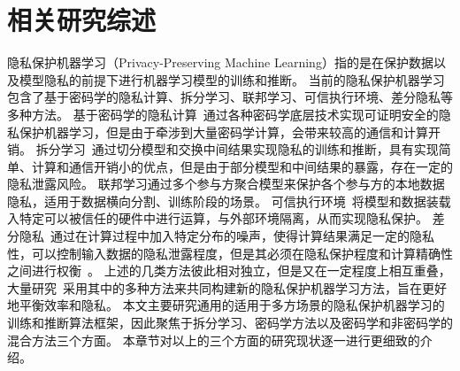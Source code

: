 \chapter{相关研究综述}
隐私保护机器学习（Privacy-Preserving Machine Learning）指的是在保护数据以及模型隐私的前提下进行机器学习模型的训练和推断。
%
当前的隐私保护机器学习包含了基于密码学的隐私计算、拆分学习、联邦学习、可信执行环境、差分隐私等多种方法。
%
基于密码学的隐私计算~\cite{al_2019_ppml}通过各种密码学底层技术实现可证明安全的隐私保护机器学习，但是由于牵涉到大量密码学计算，会带来较高的通信和计算开销。
%
拆分学习~\cite{vepakomma2018split}通过切分模型和交换中间结果实现隐私的训练和推断，具有实现简单、计算和通信开销小的优点，但是由于部分模型和中间结果的暴露，存在一定的隐私泄露风险。
%
联邦学习\cite{yangqiang2019federated,mcmahan_2017_fedavg}通过多个参与方聚合模型来保护各个参与方的本地数据隐私，适用于数据横向分割、训练阶段的场景。
%
可信执行环境~\cite{sabt_2015_tee,2016_intel_sgx}将模型和数据装载入特定可以被信任的硬件中进行运算，与外部环境隔离，从而实现隐私保护。
%
差分隐私~\cite{dwork_2006_differential_privacy,wuruihan_2023_label_dp}通过在计算过程中加入特定分布的噪声，使得计算结果满足一定的隐私性，可以控制输入数据的隐私泄露程度，但是其必须在隐私保护程度和计算精确性之间进行权衡~\cite{abadi_2016_dp_dl}。
%
上述的几类方法彼此相对独立，但是又在一定程度上相互重叠，大量研究~\cite{zhangqiao_2018_gelu_net,bonawitz_2017_secure_agg,thapa_2022_splitfed,zhou_2022_codesign,riazi_2018_chameleon,weikang_2020_fed_dp}采用其中的多种方法来共同构建新的隐私保护机器学习方法，旨在更好地平衡效率和隐私。
%
本文主要研究通用的适用于多方场景的隐私保护机器学习的训练和推断算法框架，因此聚焦于拆分学习、密码学方法以及密码学和非密码学的混合方法三个方面。
%
本章节对以上的三个方面的研究现状逐一进行更细致的介绍。



